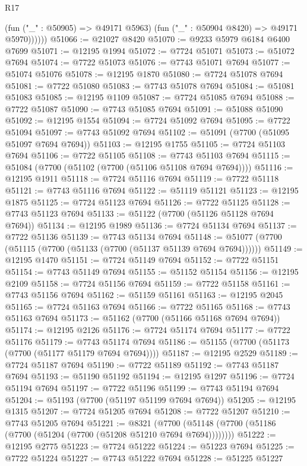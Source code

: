 \begin{lexlean}{R17}
\begin{coremodule}
              (fun ("_" : @50905) => @49171 @5963)
              (fun ("_" : @50904 @8420) => @49171 @5970))))))
@51066 := @21027 @8420
@51070 := @9233 @5979 @6184 @6400 @7699
@51071 := @12195 @1994
@51072 := @7724 @51071
@51073 := @51072 @7694
@51074 := @7722 @51073
@51076 := @7743 @51071 @7694
@51077 := @51074 @51076
@51078 := @12195 @1870
@51080 := @7724 @51078 @7694
@51081 := @7722 @51080
@51083 := @7743 @51078 @7694
@51084 := @51081 @51083
@51085 := @12195 @1109
@51087 := @7724 @51085 @7694
@51088 := @7722 @51087
@51090 := @7743 @51085 @7694
@51091 := @51088 @51090
@51092 := @12195 @1554
@51094 := @7724 @51092 @7694
@51095 := @7722 @51094
@51097 := @7743 @51092 @7694
@51102 := @51091 (@7700 (@51095 @51097 @7694 @7694))
@51103 := @12195 @1755
@51105 := @7724 @51103 @7694
@51106 := @7722 @51105
@51108 := @7743 @51103 @7694
@51115 := @51084 (@7700 (@51102 (@7700 (@51106 @51108 @7694 @7694))))
@51116 := @12195 @1911
@51118 := @7724 @51116 @7694
@51119 := @7722 @51118
@51121 := @7743 @51116 @7694
@51122 := @51119 @51121
@51123 := @12195 @1875
@51125 := @7724 @51123 @7694
@51126 := @7722 @51125
@51128 := @7743 @51123 @7694
@51133 := @51122 (@7700 (@51126 @51128 @7694 @7694))
@51134 := @12195 @1989
@51136 := @7724 @51134 @7694
@51137 := @7722 @51136
@51139 := @7743 @51134 @7694
@51148 := @51077 (@7700 (@51115 (@7700 (@51133 (@7700 (@51137 @51139 @7694 @7694))))))
@51149 := @12195 @1470
@51151 := @7724 @51149 @7694
@51152 := @7722 @51151
@51154 := @7743 @51149 @7694
@51155 := @51152 @51154
@51156 := @12195 @2109
@51158 := @7724 @51156 @7694
@51159 := @7722 @51158
@51161 := @7743 @51156 @7694
@51162 := @51159 @51161
@51163 := @12195 @2045
@51165 := @7724 @51163 @7694
@51166 := @7722 @51165
@51168 := @7743 @51163 @7694
@51173 := @51162 (@7700 (@51166 @51168 @7694 @7694))
@51174 := @12195 @2126
@51176 := @7724 @51174 @7694
@51177 := @7722 @51176
@51179 := @7743 @51174 @7694
@51186 := @51155 (@7700 (@51173 (@7700 (@51177 @51179 @7694 @7694))))
@51187 := @12195 @2529
@51189 := @7724 @51187 @7694
@51190 := @7722 @51189
@51192 := @7743 @51187 @7694
@51193 := @51190 @51192
@51194 := @12195 @1297
@51196 := @7724 @51194 @7694
@51197 := @7722 @51196
@51199 := @7743 @51194 @7694
@51204 := @51193 (@7700 (@51197 @51199 @7694 @7694))
@51205 := @12195 @1315
@51207 := @7724 @51205 @7694
@51208 := @7722 @51207
@51210 := @7743 @51205 @7694
@51221 := @8321
    (@7700 (@51148 (@7700 (@51186 (@7700 (@51204 (@7700 (@51208 @51210 @7694 @7694))))))))
@51222 := @12195 @2775
@51223 := @7724 @51222
@51224 := @51223 @7694
@51225 := @7722 @51224
@51227 := @7743 @51222 @7694
@51228 := @51225 @51227

\end{coremodule}
\end{lexlean}
